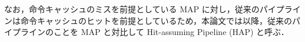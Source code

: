 なお，命令キャッシュのミスを前提としている MAP に対し，従来のパイプラインは命令キャッシュのヒットを前提としているため，本論文では以降，従来のパイプラインのことを MAP と対比して Hit-assuming Pipeline (HAP) と呼ぶ．








